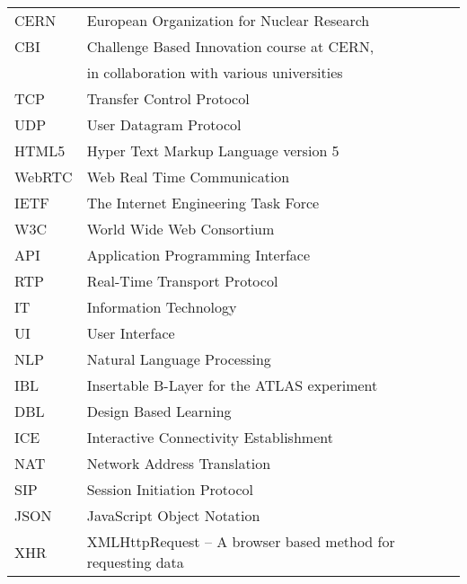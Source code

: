 \documentclass[english,12pt,a4paper,dvips]{article}
\begin{document}
\tableofcontents



\begin{tabular}{ll}
CERN        & European Organization for Nuclear Research \\
CBI         & Challenge Based Innovation course at CERN,\\
            & in collaboration with various universities \\
TCP         & Transfer Control Protocol \\ %
UDP         & User Datagram Protocol \\
HTML5       & Hyper Text Markup Language version 5 \\
WebRTC      & Web Real Time Communication \\
IETF        & The Internet Engineering Task Force \\
W3C         & World Wide Web Consortium \\
API         & Application Programming Interface \\
RTP         & Real-Time Transport Protocol \\
IT          & Information Technology \\
UI          & User Interface \\
NLP         & Natural Language Processing \\
IBL         & Insertable B-Layer for the ATLAS experiment \\
DBL         & Design Based Learning \\
ICE         & Interactive Connectivity Establishment \\
NAT         & Network Address Translation \\
SIP         & Session Initiation Protocol \\
JSON        & JavaScript Object Notation \\
XHR         & XMLHttpRequest -- A browser based method for requesting data
\end{tabular}


\cleardoublepage
\storeinipagenumber
{}
\setcounter{page}{1}
\end{document}

